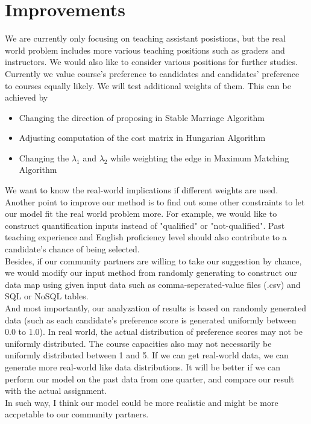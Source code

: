 \documentclass[twoside,twocolumn]{article}
\begin{document}
    \section{Improvements}
    We are currently only focusing on teaching assistant posistions, but the real world problem includes more various teaching
    positions such as graders and instructors. We would also like to consider various positions for further studies.
    \\ \indent Currently we value course's preference to candidates and candidates' preference to courses equally likely. We will
    test additional weights of them. This can be achieved by
    \begin{itemize}
        \item Changing the direction of proposing in Stable Marriage Algorithm
        \item Adjusting computation of the cost matrix in Hungarian Algorithm
        \item Changing the $\lambda_1$ and $\lambda_2$ while weighting the edge in Maximum Matching Algorithm
    \end{itemize}
    We want to know the real-world implications if different weights are used.
    \\ \indent Another point to improve our method is to find out some other constraints to let our model fit the real world problem more. For example,
    we would like to construct quantification inputs instead of "qualified" or "not-qualified". Past teaching experience and English proficiency level
    should also contribute to a candidate's chance of being selected.
    \\ \indent Besides, if our community partners are willing to take our suggestion by chance, we would modify our input method from
    randomly generating to construct our data map using given input data such as comma-seperated-value files (.csv) and 
    SQL or NoSQL tables.
    \\ \indent And most importantly, our analyzation of results is based on randomly generated data (such as each candidate's preference score is
    generated uniformly between 0.0 to 1.0). In real world, the actual distribution of preference scores may not be uniformly distributed. The course
    capacities also may not necessarily be uniformly distributed between 1 and 5. If we can get real-world data, we can generate more real-world like
    data distributions. It will be better if we can perform our model on the past data from one quarter, and compare our result with the actual assignment.
    \\ \indent In such way, I think our model could be more realistic and might be more accpetable to our community partners.
\end{document}
